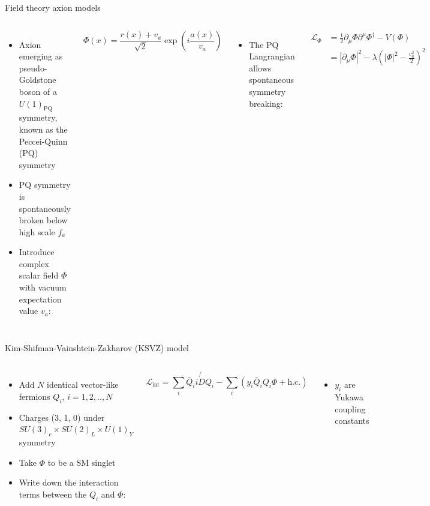 \documentclass[aspectratio=1610, 9pt]{beamer}
\begin{document}
\begin{frame}{Field theory axion models}
  \begin{columns}
    \column{\textwidth}
    \begin{itemize}
      \item Axion emerging as pseudo-Goldstone boson of a $U(1)_{\text{PQ}}$ symmetry, known as the Peccei-Quinn (PQ) symmetry
      \item PQ symmetry is spontaneously broken below high scale $f_a$
      \item Introduce complex scalar field $\Phi$ with vacuum expectation value $v_a$:
    \end{itemize}
    \begin{equation*}
      \Phi(x) = \frac{r(x)+v_a}{\sqrt{2}}\exp \left(i\frac{a(x)}{v_a}\right) 
    \end{equation*}
    \begin{itemize}
    \item The PQ Langrangian allows spontaneous symmetry breaking:
    \end{itemize}
    \begin{align*}
      \mathcal{L}_{\Phi} &= \frac{1}{2} \partial_\mu \Phi \partial^\mu \Phi^\dagger - V(\Phi) \\
      & =  {| \partial_\mu \Phi |}^2 - \lambda \left( |\Phi|^2 - \frac{v_a^2}{2} \right)^2
    \end{align*}
    \begin{itemize}
      \item Axion is massless
      \end{itemize}
  \end{columns} 
\end{frame}

\begin{frame}{Kim-Shifman-Vainshtein-Zakharov (KSVZ) model}
  \begin{columns}
    \column{\textwidth}
    \begin{itemize}
      \item Add $N$ identical vector-like fermions $Q_i$, $i=1,2,..,N$
      \item Charges (3, 1, 0) under $SU(3)_c × SU(2)_L × U(1)_Y$ symmetry
      \item Take $\Phi$ to be a SM singlet
      \item Write down the interaction terms between the $Q_i$ and $\Phi$:
    \end{itemize}
    \begin{equation*}
      \mathcal{L}_{\text{int}} = \sum_i \bar{Q}_i i \not{D} Q_i - \sum_i \left( y_i \bar{Q}_i Q_i \Phi + \text{h.c.} \right)
    \end{equation*}
    \begin{itemize}
      \item $y_i$ are Yukawa coupling constants
    \end{itemize}
  \end{columns} 
\end{frame}
\end{document}

